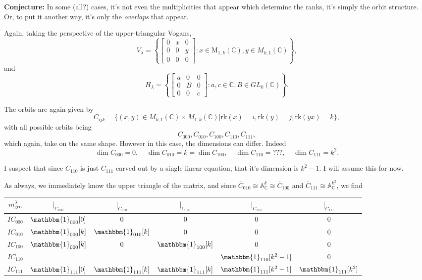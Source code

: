 \documentclass{memoir}
\newcommand{\lset}{\left\lbrace}
\newcommand{\rset}{\right\rbrace}
\newcommand{\ba}{\mathbb{A}}
\newcommand{\bc}{\mathbb{C}}
\newcommand{\tx}{\text}
\theoremstyle{definition}
\begin{document}
	\textbf{Conjecture:}  In some (all?) cases, it's not even the multiplicities that appear which determine the ranks, it's simply the orbit structure.  
	Or, to put it another way, it's only the \emph{overlaps} that appear.   
	
	Again, taking the perspective of the upper-triangular Vogans,
	$$V_\lambda=\lset\begin{bmatrix}
		0 & x & 0 \\
		0 & 0 & y \\
		0 & 0 & 0
	\end{bmatrix}  : x\in\tx{M}_{1,k}(\bc), y\in M_{k, 1}(\bc)\rset,$$
	and
	$$H_\lambda=\lset\begin{bmatrix}
		a & 0 & 0 \\
		0 & B & 0 \\
		0 & 0 & c
	\end{bmatrix} : a, c\in \bc, B\in GL_{k}(\bc)\rset.$$

	The orbits are again given by 
	$$C_{ijk}=\{(x, y)\in M_{k, 1}(\bc)\times M_{1, k}(\bc) |\tx{rk}(x)=i, \tx{rk}(y)=j, \tx{rk}(yx)=k\},$$
	with all possible orbits being 
	$$C_{000}, C_{010}, C_{100}, C_{110}, C_{111},$$
	which again, take on the same shape.  
	However in this case, the dimensions can differ.  
	Indeed
	$$\dim C_{000}=0, \ \ \ \ \ \dim C_{010}=k=\dim C_{100}, \ \ \ \ \ \dim C_{110}=???, \ \ \ \ \ \dim C_{111}=k^2.$$
	
	I suspect that since $C_{110}$ is just $C_{111}$ carved out by a single linear equation, that it's dimension is $k^2-1$.  
	I will assume this for now.  
	
	As always, we immediately know the upper triangle of the matrix, and since $\bar{C}_{010}\cong\ba_{\bc}^k\cong \bar{C}_{100}$ and $\bar{C}_{111}\cong \ba_{\bc}^{k^2}$, we find
		\begin{center}
		\begin{tabular}{ c | c c c c c}
			$m_{\tx{geo}}^\lambda$ & $|_{C_{000}}$ & $|_{C_{010}}$ & $|_{C_{100}}$ & $|_{C_{110}}$ & $|_{C_{111}}$ \\
			\hline 
			$IC_{000}$ & $\mathbbm{1}_{000}[0]$ & 0 & 0 & 0 & 0\\
			$IC_{010}$ & $\mathbbm{1}_{000}[k]$ & $\mathbbm{1}_{010}[k]$ & 0 & 0 & 0 \\
			$IC_{100}$ & $\mathbbm{1}_{000}[k]$ & 0 & $\mathbbm{1}_{100}[k]$ & 0 & 0 \\
			$IC_{110}$ &  &  &  & $\mathbbm{1}_{110}[k^2-1]$ & 0 \\
			$IC_{111}$ & $\mathbbm{1}_{111}[0]$ & $\mathbbm{1}_{111}[k]$ & $\mathbbm{1}_{111}[k]$ & $\mathbbm{1}_{111}[k^2-1]$ & $\mathbbm{1}_{111}[k^2]$ \\
		\end{tabular}
	\end{center}
	
\end{document}
